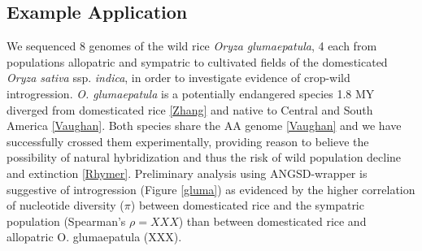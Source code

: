 \documentclass[final]{beamer}
\begin{document}
\begin{frame}[t]
\begin{multicols}{3}
%         
%		

\section{Example Application}

We sequenced 8 genomes of the wild rice \emph{Oryza glumaepatula}, 4 each from populations allopatric and sympatric to cultivated fields of the domesticated \emph{Oryza sativa} ssp. \emph{indica}, in order to investigate evidence of crop-wild introgression. 
\emph{O. glumaepatula} is a potentially endangered species 1.8 MY diverged from domesticated rice \ref{Zhang} and native to Central and South America \ref{Vaughan}. 
Both species share the AA genome \ref{Vaughan} and we have successfully crossed them experimentally, providing reason to believe the possibility of natural hybridization and thus the risk of wild population decline and extinction \ref{Rhymer}. 
Preliminary analysis using ANGSD-wrapper is suggestive of introgression (Figure \ref{gluma}) as evidenced by the higher correlation of nucleotide diversity ($\pi$) between domesticated rice and the sympatric population (Spearman's $\rho=XXX$) than between domesticated rice and allopatric O. glumaepatula (XXX).


\end{multicols}
\end{frame}
\end{document}
